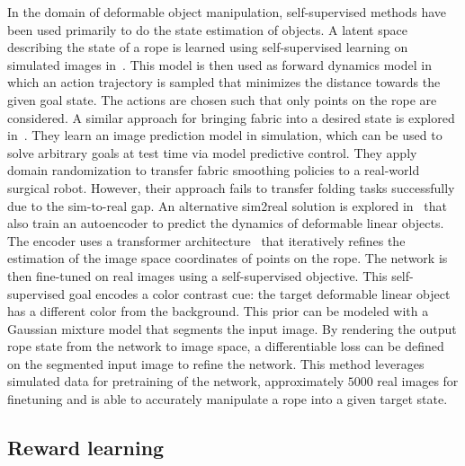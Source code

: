\documentclass[\home/main.tex]{subfiles}
\begin{document}
In the domain of deformable object manipulation, self-supervised methods have been used primarily to do the state estimation of objects. A latent space describing the state of a rope is learned using self-supervised learning on simulated images in~\autocite{yan2020learning}. This model is then used as forward dynamics model in which an action trajectory is sampled that minimizes the distance towards the given goal state. The actions are chosen such that only points on the rope are considered. A similar approach for bringing fabric into a desired state is explored in~\autocite{fabric_vsf_2020}. They learn an image prediction model in simulation, which can be used to solve arbitrary goals at test time via model predictive control. They apply domain randomization to transfer fabric smoothing policies to a real-world surgical robot. However, their approach fails to transfer folding tasks successfully due to the sim-to-real gap. An alternative sim2real solution is explored in~\autocite{Mengyuan2020} that also train an autoencoder to predict the dynamics of deformable linear objects. The encoder uses a transformer architecture~\autocite{vaswani2017attention} that iteratively refines the estimation of the image space coordinates of points on the rope. The network is then fine-tuned on real images using a self-supervised objective. This self-supervised goal encodes a color contrast cue: the target deformable linear object has a different color from the background. This prior can be modeled with a Gaussian mixture model that segments the input image. By rendering the output rope state from the network to image space, a differentiable loss can be defined on the segmented input image to refine the network. This method leverages simulated data for pretraining of the network, approximately $5000$ real images for finetuning and is able to accurately manipulate a rope into a given target state.

\subsection{Reward learning}  \label{subsec:lit_reward_learning}
\end{document}
